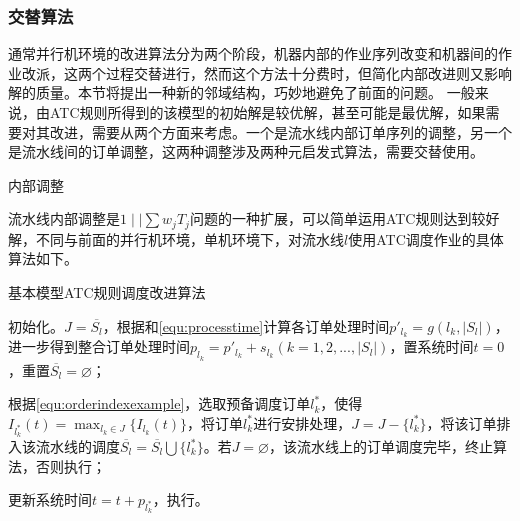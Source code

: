 \subsubsection{交替算法}
通常并行机环境的改进算法分为两个阶段，机器内部的作业序列改变和机器间的作业改派，这两个过程交替进行\cite{史烨2011}，然而这个方法十分费时，但简化内部改进则又影响解的质量。本节将提出一种新的邻域结构，巧妙地避免了前面的问题。
一般来说，由ATC规则所得到的该模型的初始解是较优解，甚至可能是最优解，如果需要对其改进，需要从两个方面来考虑。一个是流水线内部订单序列的调整，另一个是流水线间的订单调整，这两种调整涉及两种元启发式算法，需要交替使用。
\begin{asparaenum}
\item 内部调整

流水线内部调整是$1\mid\mid \sum w_jT_j$问题的一种扩展，可以简单运用ATC规则达到较好解，不同与前面的并行机环境，单机环境下，对流水线$l$使用ATC调度作业的具体算法如下。

\begin{algori}
基本模型ATC规则调度改进算法\label{alg:atcinner}
\begin{asparaenum}
\renewcommand{\labelenumi}{\bf Step\theenumi~}
\item 初始化。$J = \overline{S_l}$，根据和\eqref{equ:processtime}计算各订单处理时间$p'_{l_k} = g({l_k}, |S_l|)$，进一步得到整合订单处理时间$p_{l_k} = p'_{l_k} + s_{l_k}(k = 1,2,...,|S_l|)$，置系统时间$t = 0$，重置$\overline{S_l} = \varnothing$；
\item 根据\eqref{equ:orderindexexample}，选取预备调度订单$l_k^*$，使得$I_{l_k^*}(t) = \displaystyle\max_{l_k\in J}\{I_{l_k}(t)\}$，将订单$l_k^*$进行安排处理，$J = J -\{l_k^*\}$，将该订单排入该流水线的调度$\overline{S_l} = \overline{S_l}\bigcup \{l_k^*\} $。若$J = \varnothing$，该流水线上的订单调度完毕，终止算法，否则执行；
\item 更新系统时间$t = t + p_{l_k^*}$，执行。
\end{asparaenum}
\end{algori}


\end{asparaenum}
